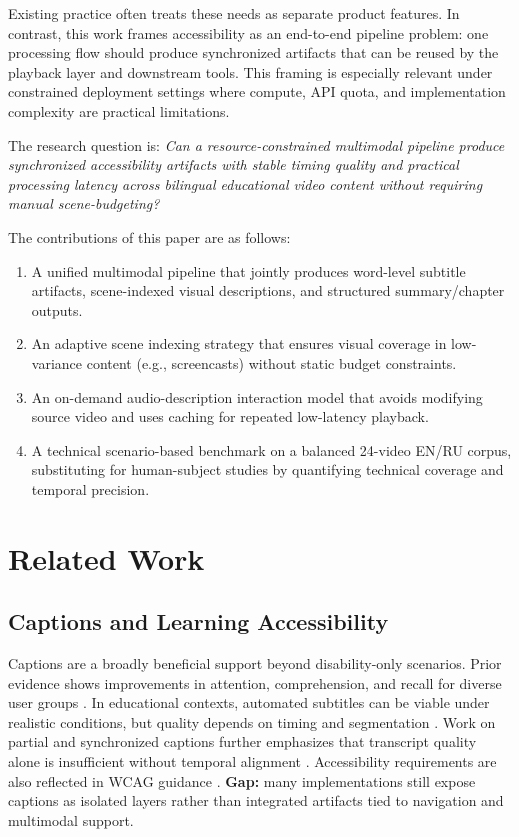 \documentclass[conference]{IEEEtran}
\begin{document}
Existing practice often treats these needs as separate product features. In contrast, this work frames accessibility as an end-to-end pipeline problem: one processing flow should produce synchronized artifacts that can be reused by the playback layer and downstream tools. This framing is especially relevant under constrained deployment settings where compute, API quota, and implementation complexity are practical limitations.

The research question is: \emph{Can a resource-constrained multimodal pipeline produce synchronized accessibility artifacts with stable timing quality and practical processing latency across bilingual educational video content without requiring manual scene-budgeting?}

The contributions of this paper are as follows:
\begin{enumerate}
\item A unified multimodal pipeline that jointly produces word-level subtitle artifacts, scene-indexed visual descriptions, and structured summary/chapter outputs.
\item An adaptive scene indexing strategy that ensures visual coverage in low-variance content (e.g., screencasts) without static budget constraints.
\item An on-demand audio-description interaction model that avoids modifying source video and uses caching for repeated low-latency playback.
\item A technical scenario-based benchmark on a balanced 24-video EN/RU corpus, substituting for human-subject studies by quantifying technical coverage and temporal precision.
\end{enumerate}

\section{Related Work}
\subsection{Captions and Learning Accessibility}
Captions are a broadly beneficial support beyond disability-only scenarios. Prior evidence shows improvements in attention, comprehension, and recall for diverse user groups \cite{Gernsbacher2015}. In educational contexts, automated subtitles can be viable under realistic conditions, but quality depends on timing and segmentation \cite{Malakul2023}. Work on partial and synchronized captions further emphasizes that transcript quality alone is insufficient without temporal alignment \cite{Mirzaei2018}. Accessibility requirements are also reflected in WCAG guidance \cite{WCAG21}. \textbf{Gap:} many implementations still expose captions as isolated layers rather than integrated artifacts tied to navigation and multimodal support.
\end{document}
